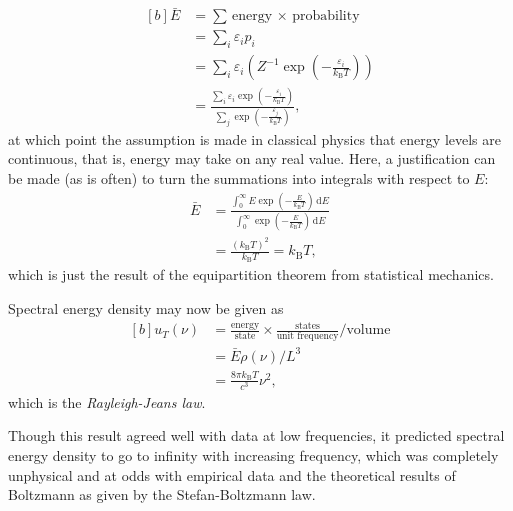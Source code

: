 \documentclass{article}
\begin{document}
\begin{equation}
    \begin{aligned}[b]
        \bar{E} &= \sum \text{energy $\times$ probability}\\
                &= \sum_i \varepsilon_i p_i \\
                &= \sum_i \varepsilon_i \left( Z^{-1} \exp\left(-\frac{\varepsilon_i}{k_\mathrm{B} T}\right) \right)\\
                &= \frac{\sum_i \varepsilon_i \exp\left( -\frac{\varepsilon_i}{k_\mathrm{B} T} \right)}{\sum_j\exp\left( -\frac{\varepsilon_j}{k_\mathrm{B}T} \right)},
    \end{aligned}\label{eq:ebarsum}
\end{equation}
at which point the assumption is made in classical physics that energy levels are continuous, that is, energy may take on any real value. Here, a justification can be made (as is often) to turn the summations into integrals with respect to $E$:
\begin{equation*}
    \begin{aligned}
        \bar{E} &= \frac{\int_0^\infty E \exp\left( -\frac{E}{k_\mathrm{B} T} \right)\,\mathrm{d}E}{\int_0^\infty \exp\left( -\frac{E}{k_\mathrm{B} T} \right)\,\mathrm{d}E} \\
            &= \frac{(k_\mathrm{B}T)^2}{k_\mathrm{B}T} = k_\mathrm{B}T,
    \end{aligned}
\end{equation*}
which is just the result of the equipartition theorem from statistical mechanics.

Spectral energy density may now be given as
\begin{equation}
    \begin{aligned}[b]
        u_T(\nu) &= \frac{\text{energy}}{\text{state}} \times \frac{\text{states}}{\text{unit frequency}} / \text{volume} \\
            &= \bar{E}\rho(\nu)/L^3 \\
            &= \frac{8\pi k_\mathrm{B}T}{c^3}\nu^2,
    \end{aligned}\label{eq:rjlaw}
\end{equation}
which is the \emph{Rayleigh-Jeans law}.

Though this result agreed well with data at low frequencies, it predicted spectral energy density to go to infinity with increasing frequency, which was completely unphysical and at odds with empirical data and the theoretical results of Boltzmann as given by the Stefan-Boltzmann law.
\end{document}

